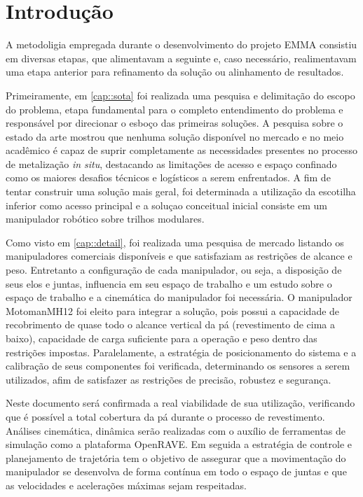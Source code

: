 \section{Introdução}

A metodoligia empregada durante o desenvolvimento do projeto EMMA consistiu em
diversas etapas, que alimentavam a seguinte e, caso necessário,
realimentavam uma etapa anterior para refinamento da solução ou alinhamento de
resultados. 

Primeiramente, em \ref{cap::sota} foi realizada uma pesquisa e delimitação
do escopo do problema, etapa fundamental para o completo entendimento do
problema e responsável por direcionar o esboço das primeiras soluções. A
pesquisa sobre o estado da arte mostrou que nenhuma solução disponível no
mercado e no meio acadêmico é capaz de suprir completamente as necessidades
presentes no processo de metalização \textit{in situ}, destacando as limitações
de acesso e espaço confinado como os maiores desafios técnicos e logísticos a
serem enfrentados. A fim de tentar construir uma solução mais geral, foi
determinada a utilização da escotilha inferior como acesso principal e a soluçao
conceitual inicial consiste em um manipulador robótico sobre trilhos modulares.

Como visto em \ref{cap::detail},  foi realizada uma pesquisa de mercado listando
os manipuladores comerciais disponíveis e que satisfaziam as restrições de alcance
e peso. Entretanto a configuração de cada manipulador, ou seja, a disposição
de seus elos e juntas, influencia em seu espaço de trabalho e um estudo sobre o
espaço de trabalho e a cinemática do manipulador foi necessária. O
manipulador Motoman\textregistered MH12 foi eleito para integrar a solução, pois
possui a capacidade de recobrimento de quase todo o alcance vertical da pá
(revestimento de cima a baixo), capacidade de carga suficiente para a operação e peso dentro das
restrições impostas. Paralelamente, a estratégia de posicionamento do sistema e
a calibração de seus componentes foi verificada, determinando os sensores a
serem utilizados, afim de satisfazer as restrições de precisão, robustez e
segurança.

Neste documento será confirmada a real viabilidade de
sua utilização, verificando que é possível a total cobertura da pá durante o
processo de revestimento. Análises cinemática, dinâmica serão realizadas com
o auxílio de ferramentas de simulação como a plataforma OpenRAVE. Em seguida a
estratégia de controle e planejamento de trajetória tem o objetivo de assegurar
que a movimentação do manipulador se desenvolva de forma contínua em todo o
espaço de juntas e que as velocidades e acelerações máximas sejam respeitadas.

